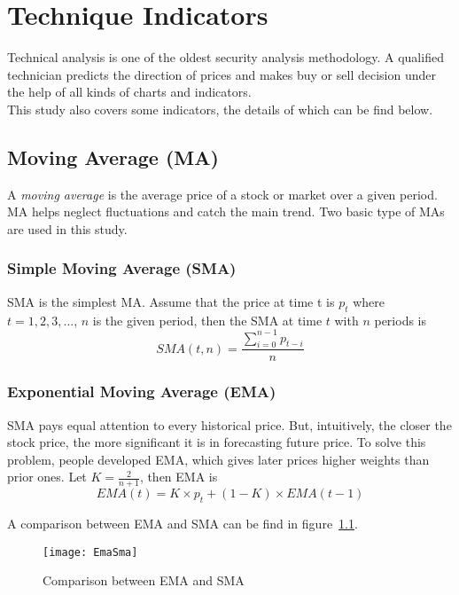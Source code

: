 \chapter{Technique Indicators}

\label{append:technical_indicator}

Technical analysis is one of the oldest security analysis methodology. A qualified technician predicts the direction of prices and makes buy or sell decision under the help of all kinds of charts and indicators.\\


This study also covers some indicators, the details of which can be find below.


\section{Moving Average (MA)\cite{kahn2006technical}}
A \textit{moving average} is the average price of a stock or market over a given period. MA helps neglect fluctuations and catch the main trend. Two basic type of MAs are used in this study.

\subsection{Simple Moving Average (SMA)}
SMA is the simplest MA. Assume that the price at time t is $ p_t $ where $t=1,2,3,\ldots$, $n$ is the given period, then the SMA at time $ t $ with $ n $ periods is
\begin{equation}
SMA(t, n)=\frac{\sum_{i=0}^{n-1}p_{t-i}}{n}
\end{equation}

\subsection{Exponential Moving Average (EMA)}  
SMA pays equal attention to every historical price. But, intuitively, the closer the stock price, the more significant it is in forecasting future price. To solve this problem, people developed EMA, which gives later prices higher weights than prior ones. Let $ K =\frac{2}{n+1} $, then EMA is 
\begin{equation}
EMA(t) = K\times p_t+(1-K) \times EMA(t-1)
\end{equation}

A comparison between EMA and SMA can be find in figure~\ref{fg:smaema}.
\begin{figure}[h]
	\centering
	\texttt{[image: EmaSma]}
	\caption{Comparison between EMA and SMA\cite{9_sma_ema}}
	\label{fg:smaema}
\end{figure}

